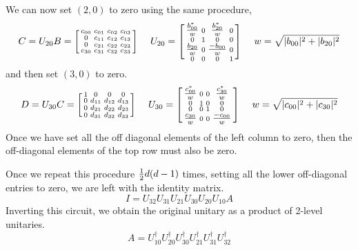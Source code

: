 We can now set $(2,0)$ to zero using the same procedure, 
\[
C = U_{20} B = \begin{bsmallmatrix}
    c_{00} & c_{01} & c_{02} & c_{03} \\
    0 & c_{11} & c_{12} & c_{13} \\
    0 & c_{21} & c_{22} & c_{23} \\
    c_{30} & c_{31} & c_{32} & c_{33}
    \end{bsmallmatrix}
    \  \quad
 	U_{20} = \begin{bsmallmatrix}
    \tfrac{b^*_{00}}{w} & 0 & \tfrac{b^*_{20}}{w} & 0\\ 
    0 & 1 & 0 & 0 \\     
    \tfrac{b_{20}}{w} & 0 & \tfrac{-b_{00}}{w} & 0 \\   
    0 & 0 & 0 & 1    
    \end{bsmallmatrix}
\  \quad w = \sqrt{|b_{00}|^2 + |b_{20}|^2}
\notag
\]
and then set $(3,0)$ to zero. 
\[
D = U_{30} C = \begin{bsmallmatrix}
    1 & 0 & 0 & 0 \\ 
    0 & d_{11} & d_{12} & d_{13} \\
    0 & d_{21} & d_{22} & d_{23} \\    
    0 & d_{31} & d_{32} & d_{33}    
    \end{bsmallmatrix}
    \  \quad
 	U_{30} = \begin{bsmallmatrix}
    \tfrac{c^*_{00}}{w} & 0 & 0 & \tfrac{c^*_{30}}{w}\\
    0 & 1 & 0 & 0 \\
    0 & 0 & 1 & 0 \\
    \tfrac{c_{30}}{w} & 0 & 0 & \tfrac{-c_{00}}{w}
    \end{bsmallmatrix}
\  \quad w = \sqrt{|c_{00}|^2 + |c_{30}|^2}
\notag
\]
Once we have set all the off diagonal elements of the left column to zero, then the off-diagonal elements of the top row must also be zero.  

Once we repeat this procedure $\tfrac{1}{2} d(d-1)$ times, setting all the lower off-diagonal entries to zero,  we are left with the identity matrix.
\[
I = U_{32} U_{31} U_{21} U_{30} U_{20} U_{10} A
\]
Inverting this circuit, we obtain the original unitary as a product of 2-level unitaries. 
\[
A = U^{\dagger}_{10} U^{\dagger}_{20} U^{\dagger}_{30} U^{\dagger}_{21} U^{\dagger}_{31} U^{\dagger}_{32}
\]


